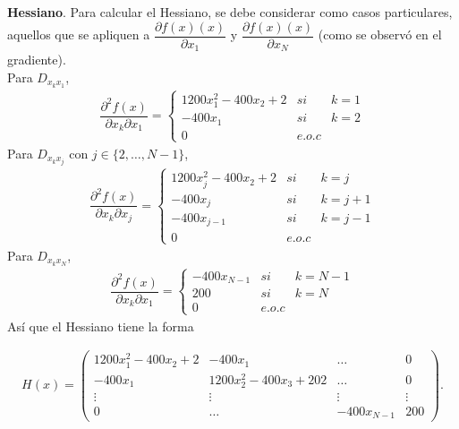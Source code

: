 \documentclass[11pt,letterpaper]{article}
\theoremstyle{definition}
\theoremstyle{definition}
\theoremstyle{definition}
\begin{document}
\textbf{Hessiano}. Para calcular el Hessiano, se debe considerar como casos particulares, aquellos que se apliquen a $ \dfrac{\partial f(x) (x)}{\partial x_1} $ y $ \dfrac{\partial f(x) (x)}{\partial x_N} $ (como se observó en el gradiente). 
\\
Para $ D_{x_k x_1 } $,
\begin{eqnarray*}
	\dfrac{\partial^2 f(x)}{\partial x_k \partial x_1} = \left\{\begin{matrix}
		1200x_1^2 -400 x_2 +2 & si & k = 1 \\
		-400x_1				  & si & k = 2 \\
		0					  & e.o.c &
	\end{matrix}\right.
\end{eqnarray*}
Para $ D_{x_k x_j} $ con $ j \in\{ 2,\dots, N-1 \} $,
\begin{eqnarray*}
	\dfrac{\partial^2 f(x)}{\partial x_k \partial x_j} = \left\{\begin{matrix}
		1200x_j^2 -400 x_2 +2 & si & k = j   \\
		-400x_j				  & si & k = j+1 \\
		-400 x_{j-1}          & si & k = j-1 \\
		0					  & e.o.c &
	\end{matrix}\right.
\end{eqnarray*}
Para $ D_{x_k x_N} $,
\begin{eqnarray*}
	\dfrac{\partial^2 f(x)}{\partial x_k \partial x_1} = \left\{\begin{matrix}
		-400 x_{N-1} & si & k = N - 1 \\
		200		     & si & k = N \\
		0					  & e.o.c &
	\end{matrix}\right.
\end{eqnarray*}
Así que el Hessiano tiene la forma
\begin{shaded}
\tiny{\begin{eqnarray*}
	H(x) = \left( \begin{matrix}
		1200x_1^2 -400 x_2 +2  &          -400 x_1         & \dots  & 0 \\
		         -400 x_1      & 1200x_2^2 - 400 x_3 + 202 & \dots  & 0 \\
		         \vdots        &            \vdots         & \vdots & \vdots \\
		            0          &               \dots       & -400x_{N-1} & 200
	\end{matrix} \right).
\end{eqnarray*}}
\end{shaded}
\end{document}
